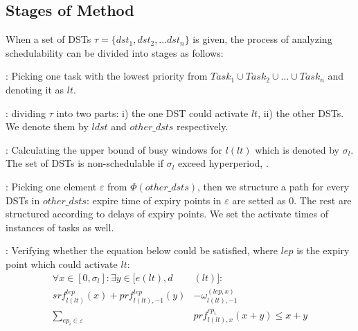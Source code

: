 \documentclass[10pt,conference]{IEEEtran}
\begin{document}
\subsection{Stages of Method}\label{section_8steps}
When a set of DSTs $\tau=\{dst_1,dst_2, \dots dst_n\}$ is given, the process of analyzing schedulability can be divided into stages as follows:
\begin{compactenum}

  \item: Picking one task with the lowest priority from $Task_1\cup Task_2\cup\dots\cup Task_n$ and denoting it as $lt$. %
  \item: dividing $\tau$ into two parts: i) the one DST could activate $lt$, ii) the other DSTs. We denote them by $ldst$ and $other\_dsts$ respectively. %

  \item: Calculating the upper bound of busy windows for $l(lt)$ which is denoted by $\sigma_l$. The set of DSTs is non-schedulable if $\sigma_l$ exceed hyperperiod, .%
  
  \item: Picking one element $\varepsilon$ from $\Phi(other\_dsts)$, then we structure a path for every DSTs in $other\_dsts$: expire time of expiry points in $\varepsilon$ are setted as 0. The rest are structured according to delays of expiry points. We set the activate times of instances of tasks as well.%

  \item: Verifying whether the equation below could be satisfied, where $lep$ is the expiry point which could activate $lt$:%
  \begin{equation}\begin{split}
      \forall x\in[0,\sigma_l]:\exists y\in[e(lt),d&(lt)]:
      \\
      srf^{lep}_{l(lt)}(x)+prf^{lep}_{l(lt),-1}(y)&-\omega^{(lep,x)}_{l(lt),-1}
      \\
      \sum\limits_{ep_i\in\varepsilon}&prf^{ep_i}_{l(lt),x}(x+y)\leq x+y
    \end{split}\label{equation_verify}\end{equation}
  

\end{compactenum}
\end{document}
